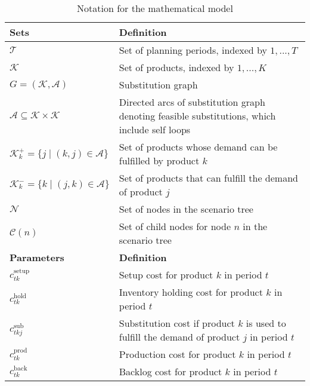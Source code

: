 \documentclass[10pt]{article}
\newcommand{\ti}{t} %
\newcommand{\TI}{\mathcal{T}}
\newcommand{\Ti}{T}
\newcommand{\ka}{k} %
\newcommand{\KA}{\mathcal{K}}
\newcommand{\Ka}{K}
\newcommand{\jey}{j} %
\newcommand{\Graf}{\mathcal{A}} %
\newcommand{\cn}{\mathcal{C}(n) }
\newcommand{\Csub}{\mathcal{K}^+_k}
\newcommand{\Psub}{\mathcal{K}^-_k}
\begin{document}
\begin{table}[H]
\centering
\caption{Notation for the mathematical model}
\begin{adjustbox}{width=1\textwidth,center=\textwidth}
\begin{tabular}{ll}
\toprule
{\textbf {Sets}} & {\textbf {Definition}} \\ \midrule
$\TI$  & Set of planning periods, indexed by $1, ... ,\Ti$ \\ 
$\KA$  & Set of products, indexed by $1, ... ,\Ka$ \\
$ G = (\KA,\mathcal{A})$  & Substitution graph \\
$ \Graf \subseteq \KA \times \KA$  & Directed arcs of substitution graph denoting feasible substitutions, which include self loops
\\
$  \Csub = \{\jey \mid (\ka,\jey) \in \Graf\}$  & Set of products whose demand can be fulfilled by product $\ka$  \\
$ \Psub = \{\ka \mid (\jey,\ka) \in \Graf\}$  & Set of products that can fulfill the demand of product $\jey$  \\
$ \mathcal{N} $  & Set of nodes in the scenario tree \\
$ \cn $  & Set of child nodes for node $n$ in the scenario tree \\
\midrule 
{\textbf {Parameters}} & {\textbf {Definition}} \\ \midrule
$c^{\text{setup}}_{\ti \ka}$ & Setup cost for product $\ka$ in period $\ti$ \\ 
$c^{\text{hold}}_{\ti \ka}$  & Inventory holding cost for product $k$ in period $\ti$  \\ 
$c^{\text{sub}}_{\ti \ka \jey }$  & Substitution cost if product $\ka$  is used to fulfill the demand of product $\jey$  in period $\ti$  \\ 
$c^{\text{prod}}_{\ti \ka}$  & Production cost for product $\ka$ in period $\ti$  \\
$c^{\text{back}}_{\ti \ka}$  & Backlog cost for product $\ka$  in period $\ti$ \\

\end{tabular}
\end{adjustbox}
\end{table}
\end{document}
